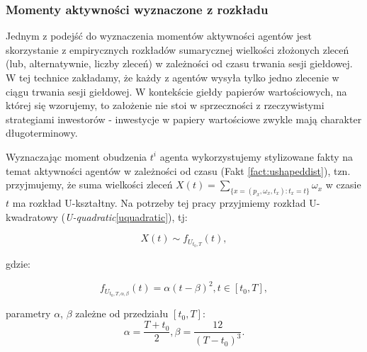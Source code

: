 \subsubsection{Momenty aktywności wyznaczone z rozkładu}
Jednym z podejść do wyznaczenia momentów aktywności agentów jest skorzystanie z empirycznych rozkładów sumarycznej wielkości złożonych zleceń (lub, alternatywnie, liczby zleceń) w zależności od czasu trwania sesji giełdowej. W tej technice zakładamy, że każdy z agentów wysyła tylko jedno zlecenie w ciągu trwania sesji giełdowej. W kontekście giełdy papierów wartościowych, na której się wzorujemy, to założenie nie stoi w sprzeczności z rzeczywistymi strategiami inwestorów - inwestycje w papiery wartościowe zwykle mają charakter długoterminowy.

Wyznaczając moment obudzenia $t^i$ agenta wykorzystujemy stylizowane fakty na temat aktywności agentów w zależności od czasu (Fakt \ref{fact:ushapeddist}), tzn. przyjmujemy, że suma wielkości zleceń $X(t) = \sum_{\{x=(p_x, \omega_x, t_x): t_x=t\}} \omega_x$ w czasie $t$ ma rozkład U-kształtny. Na potrzeby tej pracy przyjmiemy rozkład U-kwadratowy (\textit{U-quadratic}\ref{uquadratic}), tj:

$$ X(t) \sim f_{U_{t_0,T}}(t),$$

gdzie:

$$f_{U_{t_0,T, \alpha, \beta}}(t) = \alpha(t-\beta)^2, t\in[t_0,T], $$

parametry $\alpha$, $\beta$ zależne od przedziału $[t_0, T]$:
$$ \alpha = \frac{T+t_0}{2}, \beta=\frac{12}{(T-t_0)^3}.$$

